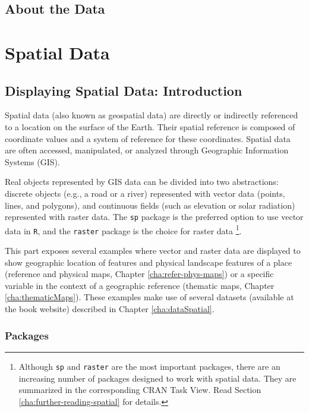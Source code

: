 \documentclass[smallroyalvopaper]{memoir}
\begin{document}
\chapter{About the Data}
\label{sec:orgheadline22}
\label{cha:dataTime}

\part{Spatial Data}
\label{sec:orgheadline37}

\chapter{Displaying Spatial Data: Introduction}
\label{sec:orgheadline33}
\label{cha:spatialIntro}

Spatial data (also known as geospatial data) are directly or indirectly referenced to a location on the surface of the Earth. Their spatial reference is composed of coordinate values and a system of reference for these coordinates. Spatial data are often accessed, manipulated, or analyzed through Geographic Information Systems (GIS).

Real objects represented by GIS data can be divided into two abstractions: discrete objects (e.g., a road or a river) represented with vector data (points, lines, and polygons), and continuous fields (such as elevation or solar radiation) represented with raster data. The \texttt{sp} package is the preferred option to use vector data in \texttt{R}, and the \texttt{raster} package is the choice for raster data \footnote{Although \texttt{sp} and \texttt{raster} are the most important packages, there are an increasing number of packages designed to work with spatial data. They are summarized in the corresponding CRAN Task View. Read Section \ref{cha:further-reading-spatial} for details.}.

This part exposes several examples where vector and raster data are displayed to show geographic location of features and physical landscape features of a place (reference and physical maps, Chapter \ref{cha:refer-phys-maps}) or a specific variable in the context of a geographic reference (thematic maps, Chapter \ref{cha:thematicMaps}). These examples make use of several datasets (available at the book website) described in Chapter \ref{cha:dataSpatial}.

\section{Packages}
\label{sec:orgheadline31}
\label{sec:spatial-packages}
\end{document}
